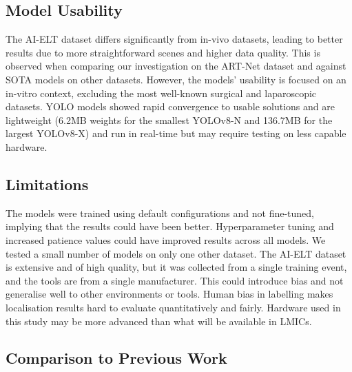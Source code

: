\subsection{Model Usability}

The AI-ELT dataset differs significantly from in-vivo datasets, leading to better results due to more straightforward scenes and higher data quality. This is observed when comparing our investigation on the ART-Net dataset and against SOTA models on other datasets. However, the models' usability is focused on an in-vitro context, excluding the most well-known surgical and laparoscopic datasets. YOLO models showed rapid convergence to usable solutions and are lightweight (6.2MB weights for the smallest YOLOv8-N and 136.7MB for the largest YOLOv8-X) and run in real-time but may require testing on less capable hardware.


\subsection{Limitations}

The models were trained using default configurations and not fine-tuned, implying that the results could have been better. Hyperparameter tuning and increased patience values could have improved results across all models. We tested a small number of models on only one other dataset. The AI-ELT dataset is extensive and of high quality, but it was collected from a single training event, and the tools are from a single manufacturer. This could introduce bias and not generalise well to other environments or tools. Human bias in labelling makes localisation results hard to evaluate quantitatively and fairly. Hardware used in this study may be more advanced than what will be available in LMICs.

\subsection{Comparison to Previous Work}


